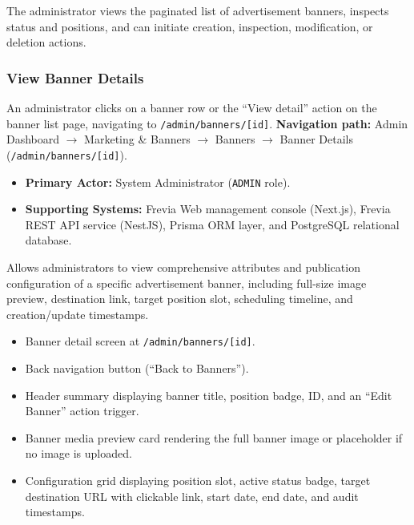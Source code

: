 \noindent The administrator views the paginated list of advertisement banners, inspects status and positions, and can initiate creation, inspection, modification, or deletion actions.

\subsubsection{ View Banner Details}

An administrator clicks on a banner row or the ``View detail'' action on the banner list page, navigating to \texttt{/admin/banners/[id]}.\newline
\textbf{Navigation path:} Admin Dashboard $\rightarrow$ Marketing \& Banners $\rightarrow$ Banners $\rightarrow$ Banner Details (\texttt{/admin/banners/[id]}).


\begin{itemize}[leftmargin=1.6em,topsep=3pt,itemsep=2pt,parsep=0pt,label=$\bullet$]
    \item \textbf{Primary Actor:} System Administrator (\texttt{ADMIN} role).
    \item \textbf{Supporting Systems:} Frevia Web management console (Next.js), Frevia REST API service (NestJS), Prisma ORM layer, and PostgreSQL relational database.
\end{itemize}

\noindent Allows administrators to view comprehensive attributes and publication configuration of a specific advertisement banner, including full-size image preview, destination link, target position slot, scheduling timeline, and creation/update timestamps.

\begin{itemize}[leftmargin=1.6em,topsep=3pt,itemsep=2pt,parsep=0pt,label=$\bullet$]
    \item Banner detail screen at \texttt{/admin/banners/[id]}.
    \item Back navigation button (``Back to Banners'').
    \item Header summary displaying banner title, position badge, ID, and an ``Edit Banner'' action trigger.
    \item Banner media preview card rendering the full banner image or placeholder if no image is uploaded.
    \item Configuration grid displaying position slot, active status badge, target destination URL with clickable link, start date, end date, and audit timestamps.
\end{itemize}

